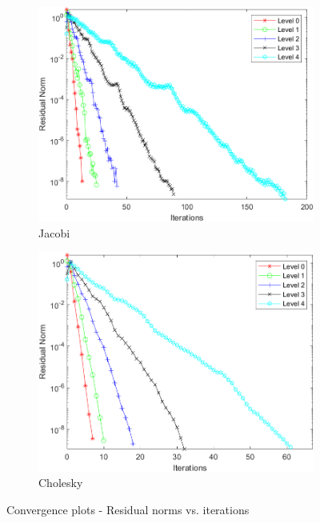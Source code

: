 \documentclass[a4paper, 11pt]{article}
\begin{document}
				\begin{figure}[H]
					\begin{subfigure}{.49\textwidth}
						\centering
						\includegraphics[width=.99\linewidth]{ConvergenceJ.png}  
						\caption{Jacobi}
						\label{fig:Jacobi}
					\end{subfigure}
					\begin{subfigure}{.49\textwidth}
						\centering
						\includegraphics[width=.99\linewidth]{ConvergenceC.png}  
						\caption{Cholesky}
						\label{fig:Chol}
					\end{subfigure}
					\caption{Convergence plots - Residual norms vs. iterations}
					\label{fig:convergence}
				\end{figure}
				
\end{document}
